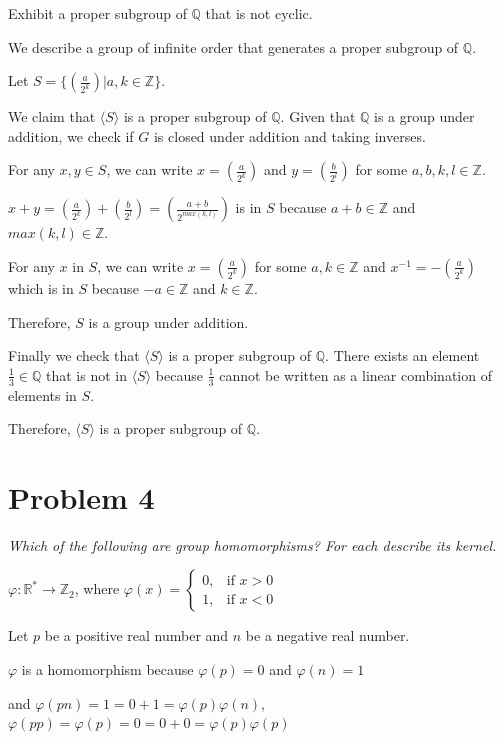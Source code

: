 \documentclass{article}
\theoremstyle{plain} %
\theoremstyle{definition} %
\begin{document}
\noindent{} Exhibit a proper subgroup of $\mathbb{Q}$ that is not cyclic.

We describe a group of infinite order that generates a proper subgroup of $\mathbb{Q}$.

Let $S = \{(\frac{a}{2^k}) | a,k \in \mathbb{Z}\}$.

We claim that $\langle S \rangle$ is a proper subgroup of $\mathbb{Q}$.
Given that $\mathbb{Q}$ is a group under addition, we check if $G$ is closed under addition and 
taking inverses.

For any $x,y \in S$, we can write $x = (\frac{a}{2^k})$ and $y = (\frac{b}{2^l})$ for some $a,b,k,l \in \mathbb{Z}$.

$x + y = (\frac{a}{2^k}) + (\frac{b}{2^l}) = (\frac{a+b}{2^{max(k,l)}})$ is in $S$ because $a+b \in \mathbb{Z}$ and $max(k,l) \in \mathbb{Z}$.

For any $x$ in $S$, we can write $x = (\frac{a}{2^k})$ for some $a,k \in \mathbb{Z}$ and
$x^{-1} = -(\frac{a}{2^k})$ which is in $S$ because $-a \in \mathbb{Z}$ and $k \in \mathbb{Z}$.

Therefore, $S$ is a group under addition.

Finally we check that $\langle S \rangle$ is a proper subgroup of $\mathbb{Q}$.
There exists an element $\frac{1}{3} \in \mathbb{Q}$ that is not in $\langle S \rangle$ because
$\frac{1}{3}$ cannot be written as a linear combination of elements in $S$.

Therefore, $\langle S \rangle$ is a proper subgroup of $\mathbb{Q}$.


\section*{Problem 4}
\noindent\textit{Which of the following are group homomorphisms? For each describe its kernel.}

\noindent{} $\varphi : \mathbb{R}^* \to \mathbb{Z}_2$, where $\varphi(x) = 
\begin{cases} 
0, & \text{if } x > 0 \\ 
1, & \text{if } x < 0 
\end{cases}$

Let $p$ be a positive real number and $n$ be a negative real number. 

$\varphi$ is a homomorphism because $\varphi(p) = 0$ and $\varphi(n) = 1$ 

and $\varphi(pn)= 1 = 0 + 1 = \varphi(p) \varphi(n)$,
$\varphi(pp) = \varphi(p) = 0 = 0 + 0 = \varphi(p)\varphi(p)$ 
\end{document}
